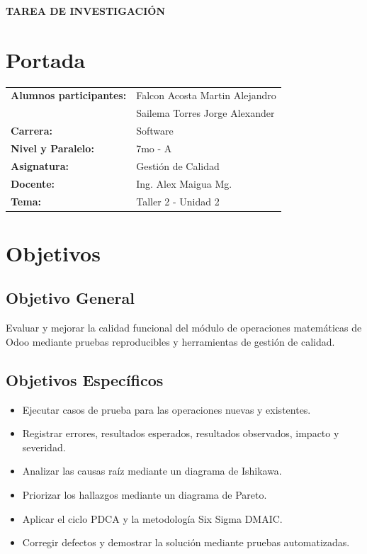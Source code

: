 \documentclass{article}
\begin{document}
\begin{center}
    {\large \textbf{TAREA DE INVESTIGACIÓN}} \\
\end{center}

\section{Portada}
\begin{flushleft}
\begin{tabular}{ l l }
    \textbf{Alumnos participantes:} & Falcon Acosta Martin Alejandro \\
    & Sailema Torres Jorge Alexander\\
    \textbf{Carrera:} & Software \\
    \textbf{Nivel y Paralelo:} & 7mo - A \\
    \textbf{Asignatura:} & Gestión de Calidad \\
    \textbf{Docente:} & Ing. Alex Maigua Mg. \\
    \textbf{Tema:} & Taller 2 - Unidad 2 \\
\end{tabular}
\end{flushleft}

\section{Objetivos}
\subsection{Objetivo General}
Evaluar y mejorar la calidad funcional del módulo de operaciones matemáticas de Odoo mediante pruebas reproducibles y herramientas de gestión de calidad.

\subsection{Objetivos Específicos}
\begin{itemize}
  \item Ejecutar casos de prueba para las operaciones nuevas y existentes.
  \item Registrar errores, resultados esperados, resultados observados, impacto y severidad.
  \item Analizar las causas raíz mediante un diagrama de Ishikawa.
  \item Priorizar los hallazgos mediante un diagrama de Pareto.
  \item Aplicar el ciclo PDCA y la metodología Six Sigma DMAIC.
  \item Corregir defectos y demostrar la solución mediante pruebas automatizadas.
\end{itemize}
\end{document}
